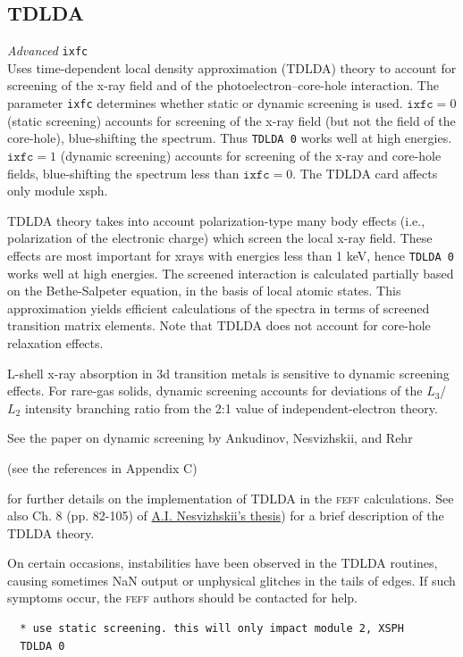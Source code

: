 \documentclass[11pt,oneside]{report} %
\renewcommand{\htmladdnormallink}[2]{\href{#2}{#1}}
\renewcommand{\htmlref}[2]{\hyperlink{#2}{#1}}
\newcommand{\program}[1]{\textsc{#1}}
\newcommand{\feff}{\program{feff}}
\newenvironment{Card}[4]%
      {\vspace{3ex}%
        \subsection{#1}
        \quad\textsl{#3}\newline
        \quad\texttt{#2}\newline%
        \label{card:#4}\\}
      {}
\renewcommand{\htmlref}[2]{{#1}} %
\begin{document}
\begin{Card}{TDLDA}{ixfc}{Advanced}{tdl}
 Uses time-dependent local density approximation (TDLDA) theory 
 to account for screening of the x-ray field and of the 
 photoelectron--core-hole interaction. The parameter \hbox{\texttt{ixfc}} 
 determines whether static or dynamic screening is used. 
 $\mathtt{ixfc}=0$ (static screening) accounts for screening 
 of the x-ray field (but not the field of the core-hole), 
 blue-shifting the spectrum. Thus \hbox{\texttt{TDLDA 0}} 
 works well at high energies. $\mathtt{ixfc}=1$ (dynamic 
 screening) accounts for screening of the x-ray and core-hole 
 fields, blue-shifting the spectrum less than $\mathtt{ixfc}=0$. 
 The TDLDA card affects only module xsph.

 TDLDA theory takes into account polarization-type many body 
 effects (i.e., polarization of the electronic charge) which screen 
 the local x-ray field. These effects are most important for xrays 
 with energies less than 1 keV, hence \hbox{\texttt{TDLDA 0}} works 
 well at high energies. The screened interaction is calculated 
 partially based on the Bethe-Salpeter equation, in the basis of 
 local atomic states. This approximation yields efficient calculations 
 of the spectra in terms of screened transition matrix elements. Note 
 that TDLDA does not account for core-hole relaxation effects.
 
 L-shell x-ray absorption in 3d transition metals is sensitive to dynamic 
 screening effects. For rare-gas solids, dynamic screening accounts for 
 deviations of the $L_{3}$/$L_{2}$ intensity branching ratio from the 2:1 
 value of independent-electron theory.
 
 See the paper on dynamic screening by Ankudinov, Nesvizhskii, and Rehr 
 \begin{latexonly}
 (see the references in \htmlref{Appendix C}{sec:Append-C-Refer}) 
 \end{latexonly}
 for further details 
 on the implementation of TDLDA in the {\feff} calculations. See also Ch. 8 (pp. 82-105) of 
 \htmladdnormallink{A.I. Nesvizhskii's thesis}{http://leonardo.phys.washington.edu/feff/papers/dissertations/thesis_nesvizhskii.ps}) for a brief description of the TDLDA theory.
 
 On certain occasions, instabilities have been observed in the TDLDA routines, causing
 sometimes NaN output or unphysical glitches in the tails of edges.  If such symptoms occur,
 the {\feff} authors should be contacted for help.

\begin{verbatim}
  * use static screening. this will only impact module 2, XSPH
  TDLDA 0
\end{verbatim}
\end{Card}
\end{document}
